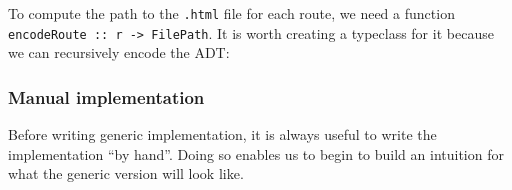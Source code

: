 To compute the path to the \texttt{.html} file for each route, we need a
function \texttt{encodeRoute\ ::\ r\ -\textgreater{}\ FilePath}. It is
worth creating a typeclass for it because we can recursively encode the
ADT:

\begin{Shaded}
\begin{Highlighting}[]
 
\OtherTok{{-}\textgreater{}} 
\end{Highlighting}
\end{Shaded}

\hypertarget{manual-implementation}{%
\subsubsection{Manual implementation}\label{manual-implementation}}

Before writing generic implementation, it is always useful to write the
implementation ``by hand''. Doing so enables us to begin to build an
intuition for what the generic version will look like.

\begin{Shaded}
\begin{Highlighting}[]
   
\OtherTok{=}\OperatorTok{\textless{}\textgreater{}} 

   
\OtherTok{=}\NormalTok{ \textbackslash{}}
     \OtherTok{{-}\textgreater{}} 
    \OtherTok{{-}\textgreater{}}  \OperatorTok{\textless{}/\textgreater{}}

   
\OtherTok{=}\NormalTok{ \textbackslash{}}
     \OtherTok{{-}\textgreater{}} 
    \OtherTok{{-}\textgreater{}}  \OperatorTok{\textless{}/\textgreater{}}
\end{Highlighting}
\end{Shaded}

